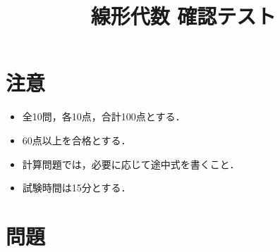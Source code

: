 \documentclass[uplatex,a4paper,12pt]{jsarticle}
\begin{document}
\title{線形代数 確認テスト}
\author{}
\date{}
\maketitle

\section*{注意}
\begin{itemize}
\item 全10問，各10点，合計100点とする．
\item 60点以上を合格とする．
\item 計算問題では，必要に応じて途中式を書くこと．
\item 試験時間は15分とする．
\end{itemize}

\section*{問題}
\end{document}
